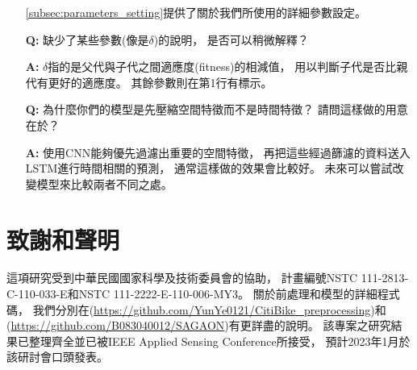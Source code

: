 \documentclass[a4paper,14pt]{extarticle}
\begin{document}
\begin{itemize}
            \ref{subsec:parameters_setting}提供了關於我們所使用的詳細參數設定。
            \item [\textbf{Q:}]
            缺少了某些參數(像是$\delta$)的說明，
            是否可以稍微解釋？
            \item [\textbf{A:}]
            $\delta$指的是父代與子代之間適應度(fitness)的相減值，
            用以判斷子代是否比親代有更好的適應度。
            其餘參數則在第1行有標示。
            \item [\textbf{Q:}]
            為什麼你們的模型是先壓縮空間特徵而不是時間特徵？
            請問這樣做的用意在於？
            \item [\textbf{A:}]
            使用CNN能夠優先過濾出重要的空間特徵，
            再把這些經過篩濾的資料送入LSTM進行時間相關的預測，
            通常這樣做的效果會比較好。
            未來可以嘗試改變模型來比較兩者不同之處。
        \end{itemize}

    \newpage
    \section{致謝和聲明}
        
        這項研究受到中華民國國家科學及技術委員會的協助，
        計畫編號NSTC 111-2813-C-110-033-E和NSTC 111-2222-E-110-006-MY3。
        關於前處理和模型的詳細程式碼，
        我們分別在(\url{https://github.com/YunYe0121/CitiBike_preprocessing})和(\url{https://github.com/B083040012/SAGAON})有更詳盡的說明。
        該專案之研究結果已整理齊全並已被IEEE Applied Sensing Conference\cite{SAGAON}所接受，
        預計2023年1月於該研討會口頭發表。

    \clearpage
        \renewcommand\refname{\arabic{section}\hspace{1em}參考文獻}
        
        
\end{document}
